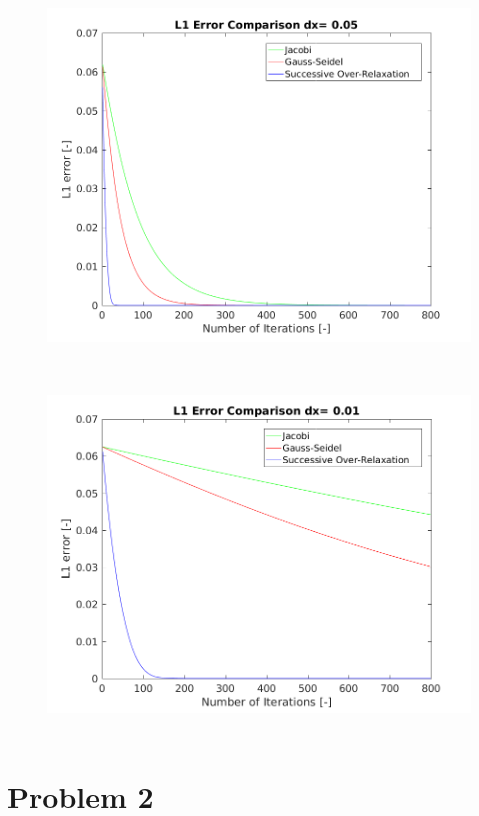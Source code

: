\documentclass[12pt]{article}
\begin{document}
	\begin{figure}[H]
		\centering
		\includegraphics[height=3.75in]{p1_005.png}
		\label{fig:problem2_plot}
	\end{figure}
		
	\begin{figure}[H]
		\centering
		\includegraphics[height=3.75in]{p1_001.png}
		\label{fig:problem2_plot}
	\end{figure}
	
	
	
		
	\section{Problem 2}
	
\end{document}
